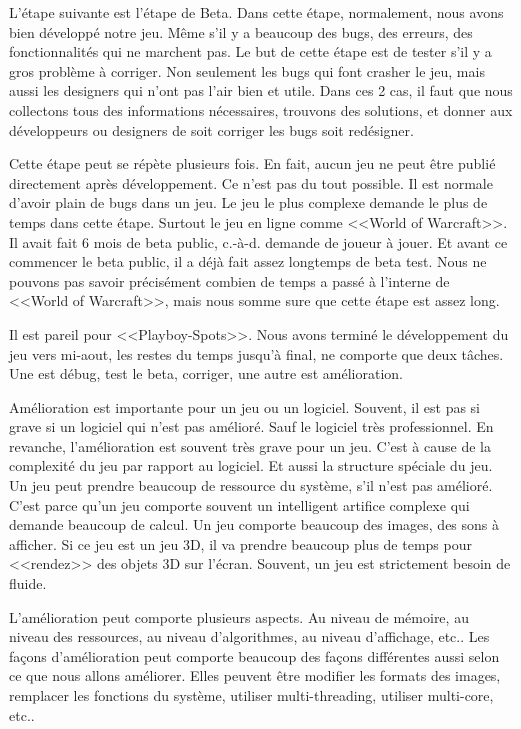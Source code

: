 L'étape suivante est l'étape de Beta. Dans cette étape, normalement, nous avons bien développé notre jeu. Même s'il y a beaucoup des bugs, des erreurs, des fonctionnalités qui ne marchent pas. Le but de cette étape est de tester s'il y a gros problème à corriger. Non seulement les bugs qui font crasher le jeu, mais aussi les designers qui n'ont pas l'air bien et utile. Dans ces 2 cas, il faut que nous collectons tous des informations nécessaires, trouvons des solutions, et donner aux développeurs ou designers de soit corriger les bugs soit redésigner. 

Cette étape peut se répète plusieurs fois. En fait, aucun jeu ne peut être publié directement après développement. Ce n'est pas du tout possible. Il est normale d'avoir plain de bugs dans un jeu. Le jeu le plus complexe demande le plus de temps dans cette étape. Surtout le jeu en ligne comme <<World of Warcraft>>. Il avait fait 6 mois de beta public, c.-à-d. demande de joueur à jouer. Et avant ce commencer le beta public, il a déjà fait assez longtemps de beta test. Nous ne pouvons pas savoir précisément combien de temps a passé à l'interne de <<World of Warcraft>>, mais nous somme sure que cette étape est assez long. 

Il est pareil pour <<Playboy-Spots>>. Nous avons terminé le développement du jeu vers mi-aout, les restes du temps jusqu'à final, ne comporte que deux tâches. Une est débug, test le beta, corriger, une autre est amélioration. 

Amélioration est importante pour un jeu ou un logiciel. Souvent, il est pas si grave si un logiciel qui n'est pas amélioré. Sauf le logiciel très professionnel. En revanche, l'amélioration est souvent très grave pour un jeu. C'est à cause de la complexité du jeu par rapport au logiciel. Et aussi la structure spéciale du jeu. Un jeu peut prendre beaucoup de ressource du système, s'il n'est pas amélioré. C'est parce qu’un jeu comporte souvent un intelligent artifice complexe qui demande beaucoup de calcul. Un jeu comporte beaucoup des images, des sons à afficher. Si ce jeu est un jeu 3D, il va prendre beaucoup plus de temps pour <<rendez>> des objets 3D sur l'écran. Souvent, un jeu est strictement besoin de fluide. 

L'amélioration peut comporte plusieurs aspects. Au niveau de mémoire, au niveau des ressources, au niveau d’algorithmes, au niveau d'affichage, etc.. Les façons d'amélioration peut comporte beaucoup des façons différentes aussi selon ce que nous allons améliorer. Elles peuvent être modifier les formats des images, remplacer les fonctions du système, utiliser multi-threading, utiliser multi-core, etc..


